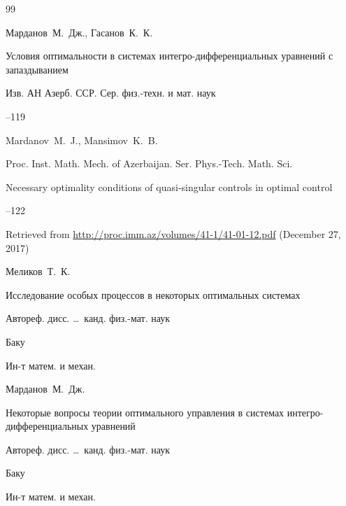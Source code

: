 \begin{thebibliography}{99}

\by Марданов~М.~Дж., Гасанов~К.~К.

\paper Условия оптимальности в системах интегро-дифференциальных уравнений с запаздыванием 

\jour Изв. АН Азерб. ССР. Сер. физ.-техн. и мат. наук



--119




\by Mardanov~M.~J., Mansimov~K.~B. 

\jour Proc. Inst. Math. Mech. of Azerbaijan. Ser. Phys.-Tech. Math. Sci.

\paper Necessary optimality conditions of quasi-singular controls in optimal control




–122

\elink Retrieved from  \url{http://proc.imm.az/volumes/41-1/41-01-12.pdf} (December 27, 2017) 









\by Меликов~Т.~К.

\thesis Исследование особых процессов в некоторых оптимальных системах  

\thesisinfo Автореф. дисс. \dots\ канд. физ.-мат. наук

\publaddr Баку

\publ Ин-т матем. и механ.








\by Марданов~М.~Дж.  

\thesis Некоторые вопросы теории оптимального управления в системах интегро-дифференциальных уравнений  

\thesisinfo Автореф. дисс. \dots\ канд. физ.-мат. наук

\publaddr Баку

\publ Ин-т матем. и механ.


\end{thebibliography}
